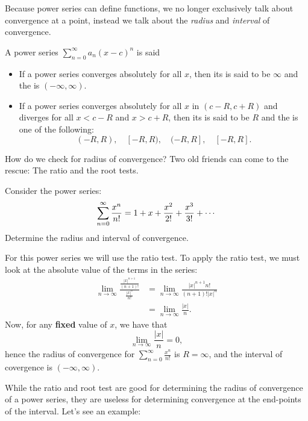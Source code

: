 \documentclass{ximera}
\begin{document}
Because power series can define functions, we no longer exclusively
talk about convergence at a point, instead we talk about the
\textit{radius} and \textit{interval} of convergence.

\begin{definition}
  A power series $\sum_{n=0}^\infty a_n(x-c)^n$ is said
  \begin{itemize}
    \item If a power series converges absolutely for all $x$, then its
       is said to be $\infty$ and the
       is $(-\infty,\infty)$.
    \item If a power series converges absolutely for all $x$ in
      $(c-R,c+R)$ and diverges for all $x<c-R$ and $x>c+R$, then its
       is said to be $R$ and the
       is one of the following:
      \[
      (-R,R),\quad [-R,R),\quad (-R,R],\quad [-R,R].
      \]
  \end{itemize}
\end{definition}

How do we check for radius of convergence? Two old friends can come to
the rescue: The ratio and the root tests.

\begin{example}
  Consider the power series:
  \[
  \sum_{n=0}^\infty \frac{x^n}{n!} = 1 + x + \frac{x^2}{2!} + \frac{x^3}{3!} + \cdots\\
  \]
  Determine the radius and interval of convergence.
  \begin{explanation}
    For this power series we will use the ratio test. To apply the
    ratio test, we must look at the absolute value of the terms in the
    series:
    \begin{align*}
      \lim_{n\to\infty} \frac{\frac{|x|^{n+1}}{(n+1)!}}{\frac{|x|^n}{n!}}
      &= \lim_{n\to\infty} \frac{|x|^{n+1}n!}{(n+1)!|x|^n}\\
      &= \lim_{n\to\infty} \frac{|x|}{n}.
    \end{align*}
    Now, for any \textbf{fixed} value of $x$, we have that
    \[
    \lim_{n\to\infty} \frac{|x|}{n} = 0,
    \]
    hence the radius of convergence for $\sum_{n=0}^\infty
    \frac{x^n}{n!}$ is $R=\infty$, and the interval of covergence is $(-\infty, \infty)$.
  \end{explanation}
\end{example}

While the ratio and root test are good for determining the radius of
convergence of a power series, they are useless for determining
convergence at the end-points of the interval. Let's see an example:
\end{document}
